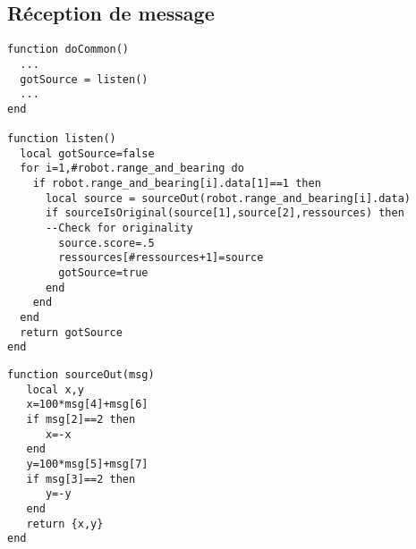 \begin{subappendices}
\subsection{Réception de message}

\begin{lstlisting}[caption=Ecoute du capteur à chaque pas]
function doCommon()
  ...
  gotSource = listen()
  ...
end

function listen()
  local gotSource=false
  for i=1,#robot.range_and_bearing do
    if robot.range_and_bearing[i].data[1]==1 then
      local source = sourceOut(robot.range_and_bearing[i].data)
      if sourceIsOriginal(source[1],source[2],ressources) then
      --Check for originality
        source.score=.5
        ressources[#ressources+1]=source
        gotSource=true
      end
    end
  end
  return gotSource
end
\end{lstlisting}

\begin{lstlisting}[caption=Décodage du message]
function sourceOut(msg)
   local x,y
   x=100*msg[4]+msg[6]
   if msg[2]==2 then
      x=-x
   end
   y=100*msg[5]+msg[7]
   if msg[3]==2 then
      y=-y
   end
   return {x,y}
end
\end{lstlisting}

\end{subappendices}
